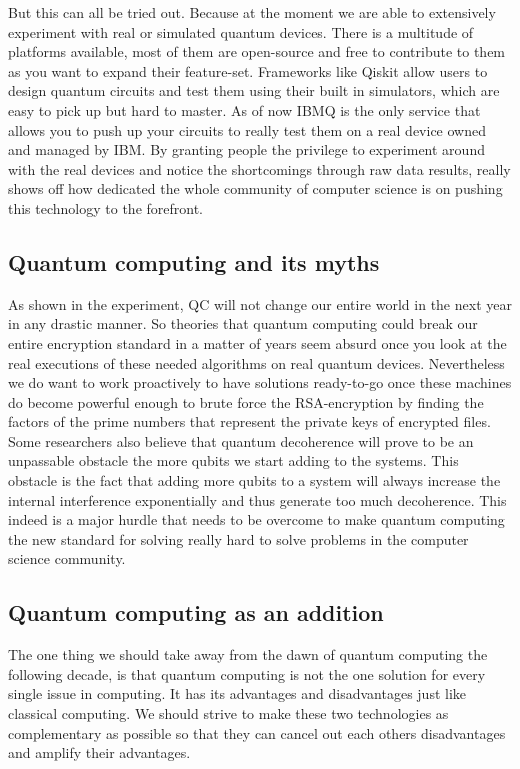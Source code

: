 But this can all be tried out. Because at the moment we are able to extensively experiment with real or simulated quantum devices. There is a multitude of platforms available, most of them are open-source and free to contribute to them as you want to expand their feature-set. Frameworks like Qiskit allow users to design quantum circuits and test them using their built in simulators, which are easy to pick up but hard to master. As of now IBMQ is the only service that allows you to push up your circuits to really test them on a real device owned and managed by IBM. By granting people the privilege to experiment around with the real devices and notice the shortcomings through raw data results, really shows off how dedicated the whole community of computer science is on pushing this technology to the forefront.


\subsection{Quantum computing and its myths}

As shown in the experiment, QC will not change our entire world in the next year in any drastic manner. So theories that quantum computing could break our entire encryption standard in a matter of years seem absurd once you look at the real executions of these needed algorithms on real quantum devices.
Nevertheless we do want to work proactively to have solutions ready-to-go once these machines do become powerful enough to brute force the RSA-encryption by finding the factors of the prime numbers that represent the private keys of encrypted files.
Some researchers also believe that quantum decoherence will prove to be an unpassable obstacle the more qubits we start adding to the systems. This obstacle is the fact that adding more qubits to a system will always increase the internal interference exponentially and thus generate too much decoherence. This indeed is a major hurdle that needs to be overcome to make quantum computing the new standard for solving really hard to solve problems in the computer science community.

\subsection{Quantum computing as an addition}

The one thing we should take away from the dawn of quantum computing the following decade, is that quantum computing is not the one solution for every single issue in computing. It has its advantages and disadvantages just like classical computing. We should strive to make these two technologies as complementary as possible so that they can cancel out each others disadvantages and amplify their advantages. 

